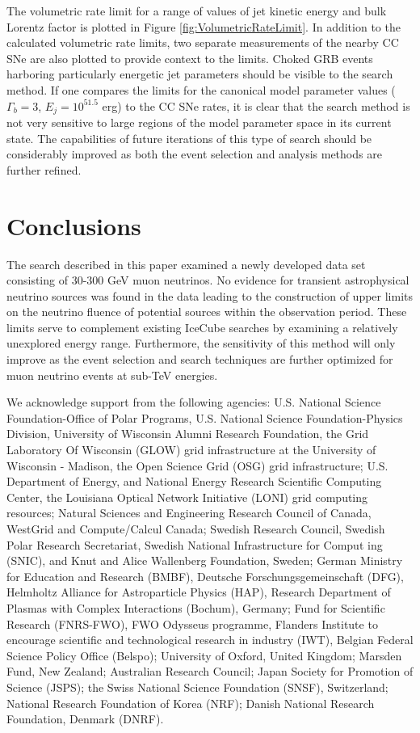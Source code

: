 \documentclass[manuscript]{aastex}
\begin{document}
The volumetric rate limit for a range of values of jet kinetic energy and bulk Lorentz factor is plotted in Figure \ref{fig:VolumetricRateLimit}. In addition to the calculated volumetric rate limits, two separate measurements of the nearby CC SNe are also plotted to provide context to the limits. Choked GRB events harboring particularly energetic jet parameters should be visible to the search method. If one compares the limits for the canonical model parameter values ($\Gamma_b = 3$, $E_j = 10^{51.5}$ erg) to the CC SNe rates, it is clear that the search method is not very sensitive to large regions of the model parameter space in its current state. The capabilities of future iterations of this type of search should be considerably improved as both the event selection and analysis methods are further refined.	
\section{Conclusions}
The search described in this paper examined a newly developed data set consisting of 30-300 GeV muon neutrinos. No evidence for transient astrophysical neutrino sources was found in the data leading to the construction of upper limits on the neutrino fluence of potential sources within the observation period. These limits serve to complement existing IceCube searches by examining a relatively unexplored energy range. Furthermore, the sensitivity of this method will only improve as the event selection and search techniques are further optimized for muon neutrino events at sub-TeV energies.



\acknowledgments
We acknowledge support from the following agencies: U.S. National Science 
Foundation-Office of Polar Programs, U.S. National Science Foundation-Physics
Division, University of Wisconsin Alumni Research Foundation, the Grid
Laboratory Of Wisconsin (GLOW) grid infrastructure at the University of
Wisconsin - Madison, the Open Science Grid (OSG) grid infrastructure; U.S.
Department of Energy, and National Energy Research Scientific Computing Center, 
the Louisiana Optical Network Initiative (LONI) grid computing resources;
Natural Sciences and Engineering Research Council of Canada, WestGrid and
Compute/Calcul Canada; Swedish Research Council, Swedish Polar Research
Secretariat, Swedish National Infrastructure for Comput ing (SNIC), and Knut
and Alice Wallenberg Foundation, Sweden; German Ministry for Education and
Research (BMBF), Deutsche Forschungsgemeinschaft (DFG), Helmholtz Alliance for
Astroparticle Physics (HAP), Research Department of Plasmas with Complex 
Interactions (Bochum), Germany; Fund for Scientific Research (FNRS-FWO), FWO
Odysseus programme, Flanders Institute to encourage scientific and
technological research in industry (IWT), Belgian Federal Science Policy Office
(Belspo); University of Oxford, United Kingdom; Marsden Fund, New Zealand;
Australian Research Council; Japan Society for Promotion of Science (JSPS); the
Swiss National Science Foundation (SNSF), Switzerland; National Research
Foundation of Korea (NRF); Danish National Research Foundation, Denmark (DNRF). 
\end{document}
